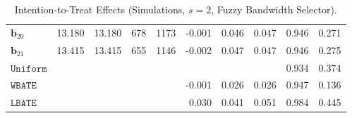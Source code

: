 \documentclass[10pt]{article}
\newcommand{\bb}{\mathbf{b}}
\begin{document}
\begin{table}[p]
\begin{tabular}{lccccrrrrr}
$\bb_{20}$ & 13.180 & 13.180 & 678 & 1173 & -0.001 & 0.046 & 0.047 & 0.946 & 0.271 \\
$\bb_{21}$ & 13.415 & 13.415 & 655 & 1146 & -0.002 & 0.047 & 0.047 & 0.946 & 0.275 \\
\midrule
$\mathtt{Uniform}$ &  &  &  &  &  &  &  & 0.934 & 0.374 \\
\midrule
$\mathtt{WBATE}$ &  &  &  &  & -0.001 & 0.026 & 0.026 & 0.947 & 0.136 \\
\midrule
$\mathtt{LBATE}$ &  &  &  &  & 0.030 & 0.041 & 0.051 & 0.984 & 0.445 \\
\bottomrule\bottomrule
\end{tabular}

    \caption{Intention-to-Treat Effects (Simulations, $s=2$, Fuzzy Bandwidth Selector).}
    \label{tab:sa-simuls-itt-s2-bwmain}
\end{table}
\end{document}
